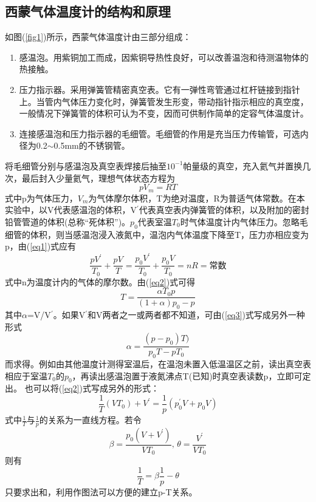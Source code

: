 \documentclass[a4paper]{article}
\begin{document}
\subsection{西蒙气体温度计的结构和原理}
如图(\ref{fig1})所示，西蒙气体温度计由三部分组成：
\begin{enumerate}
\item 感温泡。用紫铜加工而成，因紫铜导热性良好，可以改善温泡和待测温物体的热接触。
\item 压力指示器。采用弹簧管精密真空表。它有一弹性弯管通过杠杆链接到指针上。当管内气体压力变化时，弹簧管发生形变，带动指针指示相应的真空度，一般情况下弹簧管的体积可认为不变，因而可供制作简单的定容气体温度计。
\item 连接感温泡和压力指示器的毛细管。毛细管的作用是充当压力传输管，可选内径为0.2$\sim$0.5mm的不锈钢管。
\end{enumerate}
将毛细管分别与感温泡及真空表焊接后抽至$10^{-1}$帕量级的真空，充入氦气并置换几次，最后封入少量氦气，理想气体状态方程为
\begin{equation}
pV_m = RT\label{eq1}
\end{equation}
式中p为气体压力，$V_m$为气体摩尔体积，T为绝对温度，R为普适气体常数。在本实验中，以V代表感温泡的体积，V$^{'}$代表真空表内弹簧管的体积，以及附加的密封铅管管道的体积(总称“死体积”)。$p_0$代表室温$T_0$时气体温度计内气体压力。忽略毛细管的体积，则当感温泡浸入液氮中，温泡内气体温度下降至T，压力亦相应变为p，由(\ref{eq1})式应有
\begin{equation}
\frac{pV^{'}}{T_0} + \frac{pV}{T} = \frac{p_0V^{'}}{T_0} + \frac{p_0V}{T_0} = nR = \text{常数}\label{eq2}
\end{equation}
式中n为温度计内的气体的摩尔数。由(\ref{eq2})式可得
\begin{equation}
T = \frac{\alpha T_0p}{(1+\alpha)p_0 - p}\label{eq3}
\end{equation}
其中$\alpha$=V/V$^{'}$。如果V$^{'}$和V两者之一或两者都不知道，可由(\ref{eq3})式写成另外一种形式
\begin{equation}
\alpha = \frac{(p - p_0)T)}{p_0T - pT_0}\label{eq4}
\end{equation}
而求得。例如由其他温度计测得室温后，在温泡未置入低温温区之前，读出真空表相应于室温$T_0$的$p_0$，再读出感温泡置于液氮沸点T(已知)时真空表读数p，立即可定出。
也可以将(\ref{eq2})式写成另外的形式：
\begin{equation}
\frac{1}{T}(VT_0) + V^{'} = \frac{1}{p}(p_0^{'}V + p_0V)\label{eq5}
\end{equation}
式中$\frac{1}{T}$与$\frac{1}{p}$的关系为一直线方程。若令
\begin{equation}
\beta = \frac{p_0(V+V^{'})}{VT_0}\text{, }\theta = \frac{V^{'}}{VT_0}\label{eq6}
\end{equation}
则有
\begin{equation}
\frac{1}{T} = \beta\frac{1}{p} - \theta\label{eq7}
\end{equation}
只要求出和，利用作图法可以方便的建立p-T关系。
\end{document}
